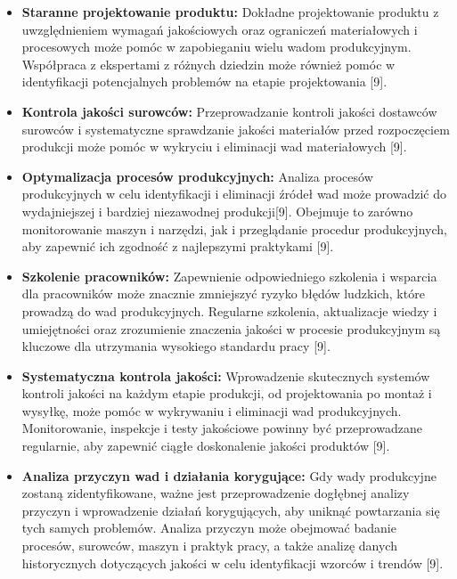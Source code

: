 \begin{itemize}
\item \textbf{Staranne projektowanie produktu:} Dokładne projektowanie produktu z uwzględnieniem wymagań jakościowych oraz ograniczeń materiałowych i procesowych może pomóc w zapobieganiu wielu wadom produkcyjnym. Współpraca z ekspertami z różnych dziedzin może również pomóc w identyfikacji potencjalnych problemów na etapie projektowania [9].

\item \textbf{Kontrola jakości surowców:} Przeprowadzanie kontroli jakości dostawców surowców i systematyczne sprawdzanie jakości materiałów przed rozpoczęciem produkcji może pomóc w wykryciu i eliminacji wad materiałowych [9].

\item \textbf{Optymalizacja procesów produkcyjnych:} Analiza procesów produkcyjnych w celu identyfikacji i eliminacji źródeł wad może prowadzić do wydajniejszej i bardziej niezawodnej produkcji[9]. Obejmuje to zarówno monitorowanie maszyn i narzędzi, jak i przeglądanie procedur produkcyjnych, aby zapewnić ich zgodność z najlepszymi praktykami [9].

\item \textbf{Szkolenie pracowników:} Zapewnienie odpowiedniego szkolenia i wsparcia dla pracowników może znacznie zmniejszyć ryzyko błędów ludzkich, które prowadzą do wad produkcyjnych. Regularne szkolenia, aktualizacje wiedzy i umiejętności oraz zrozumienie znaczenia jakości w procesie produkcyjnym są kluczowe dla utrzymania wysokiego standardu pracy [9].

\item \textbf{Systematyczna kontrola jakości:} Wprowadzenie skutecznych systemów kontroli jakości na każdym etapie produkcji, od projektowania po montaż i wysyłkę, może pomóc w wykrywaniu i eliminacji wad produkcyjnych. Monitorowanie, inspekcje i testy jakościowe powinny być przeprowadzane regularnie, aby zapewnić ciągłe doskonalenie jakości produktów [9].

\item \textbf{Analiza przyczyn wad i działania korygujące:} Gdy wady produkcyjne zostaną zidentyfikowane, ważne jest przeprowadzenie dogłębnej analizy przyczyn i wprowadzenie działań korygujących, aby uniknąć powtarzania się tych samych problemów. Analiza przyczyn może obejmować badanie procesów, surowców, maszyn i praktyk pracy, a także analizę danych historycznych dotyczących jakości w celu identyfikacji wzorców i trendów [9].


\end{itemize}
